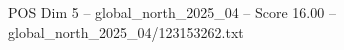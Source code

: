 \begin{textsample}{POS Dim 5 – global\_north\_2025\_04 – Score 16.00 – global\_north\_2025\_04/123153262.txt}
\end{textsample}
